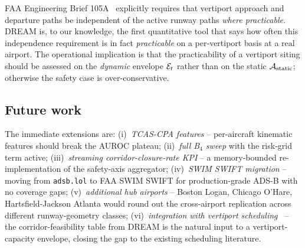 FAA Engineering Brief 105A~\citep{faa_eb_105a} explicitly requires that
vertiport approach and departure paths be independent of the active runway
paths \emph{where practicable}. DREAM is, to our knowledge, the first
quantitative tool that says how often this independence requirement is in
fact \emph{practicable} on a per-vertiport basis at a real airport. The
operational implication is that the practicability of a vertiport siting
should be assessed on the \emph{dynamic} envelope $\mathcal{E}_t$ rather than on the
static $\mathcal{A}_{\mathrm{static}}$; otherwise the safety case is over-conservative.

\subsection{Future work}

The immediate extensions are:
(i)~\emph{TCAS-CPA features} -- per-aircraft kinematic features should
break the AUROC plateau;
(ii)~\emph{full B$_4$ sweep} with the risk-grid term active;
(iii)~\emph{streaming corridor-closure-rate KPI} -- a memory-bounded
re-implementation of the safety-axis aggregator;
(iv)~\emph{SWIM SWIFT migration} -- moving from \texttt{adsb.lol} to FAA
SWIM SWIFT for production-grade ADS-B with no coverage gaps;
(v)~\emph{additional hub airports} -- Boston Logan, Chicago O'Hare,
Hartsfield-Jackson Atlanta would round out the cross-airport replication
across different runway-geometry classes;
(vi)~\emph{integration with vertiport scheduling}~\citep{vascik2019} --
the corridor-feasibility table from DREAM is the natural input to a
vertiport-capacity envelope, closing the gap to the existing scheduling
literature.

